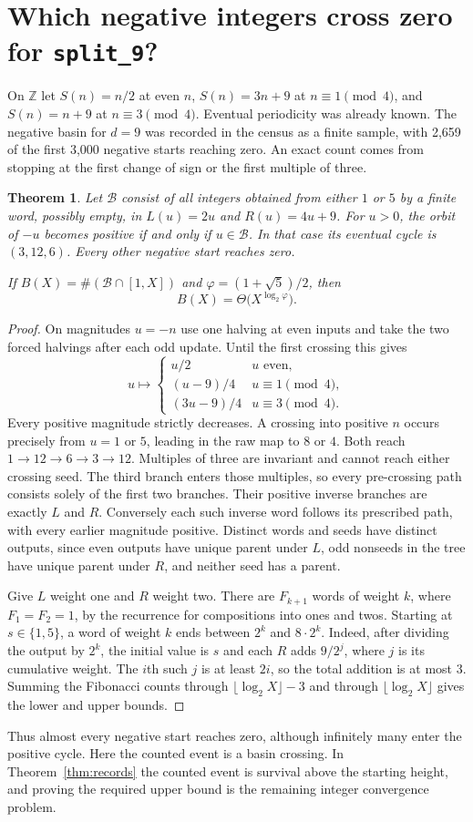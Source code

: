 \documentclass[11pt,a4paper]{article}
\newtheorem{theorem}{Theorem}
\begin{document}
\section{Which negative integers cross zero for \texttt{split\_9}?}
On $\mathbb Z$ let $S(n)=n/2$ at even $n$, $S(n)=3n+9$ at $n\equiv1\pmod4$, and $S(n)=n+9$ at $n\equiv3\pmod4$. Eventual periodicity was already known. The negative basin for $d=9$ was recorded in the census as a finite sample, with 2,659 of the first 3,000 negative starts reaching zero. An exact count comes from stopping at the first change of sign or the first multiple of three.
\begin{theorem}
Let $\mathcal B$ consist of all integers obtained from either $1$ or $5$ by a finite word, possibly empty, in $L(u)=2u$ and $R(u)=4u+9$. For $u>0$, the orbit of $-u$ becomes positive if and only if $u\in\mathcal B$. In that case its eventual cycle is $(3,12,6)$. Every other negative start reaches zero.

If $B(X)=\#(\mathcal B\cap[1,X])$ and $\varphi=(1+\sqrt5)/2$, then
\[
 B(X)=\Theta\bigl(X^{\log_2\varphi}\bigr).
\]
\end{theorem}
\begin{proof}
On magnitudes $u=-n$ use one halving at even inputs and take the two forced halvings after each odd update. Until the first crossing this gives
\[
 u\longmapsto
 \begin{cases}
 u/2&u\text{ even},\\
 (u-9)/4&u\equiv1\pmod4,\\
 (3u-9)/4&u\equiv3\pmod4 .
 \end{cases}
\]
Every positive magnitude strictly decreases. A crossing into positive $n$ occurs precisely from $u=1$ or $5$, leading in the raw map to $8$ or $4$. Both reach $1\to12\to6\to3\to12$. Multiples of three are invariant and cannot reach either crossing seed. The third branch enters those multiples, so every pre-crossing path consists solely of the first two branches. Their positive inverse branches are exactly $L$ and $R$. Conversely each such inverse word follows its prescribed path, with every earlier magnitude positive. Distinct words and seeds have distinct outputs, since even outputs have unique parent under $L$, odd nonseeds in the tree have unique parent under $R$, and neither seed has a parent.

Give $L$ weight one and $R$ weight two. There are $F_{k+1}$ words of weight $k$, where $F_1=F_2=1$, by the recurrence for compositions into ones and twos. Starting at $s\in\{1,5\}$, a word of weight $k$ ends between $2^k$ and $8\cdot2^k$. Indeed, after dividing the output by $2^k$, the initial value is $s$ and each $R$ adds $9/2^j$, where $j$ is its cumulative weight. The $i$th such $j$ is at least $2i$, so the total addition is at most $3$. Summing the Fibonacci counts through $\lfloor\log_2 X\rfloor-3$ and through $\lfloor\log_2 X\rfloor$ gives the lower and upper bounds.
\end{proof}
Thus almost every negative start reaches zero, although infinitely many enter the positive cycle. Here the counted event is a basin crossing. In Theorem~\ref{thm:records} the counted event is survival above the starting height, and proving the required upper bound is the remaining integer convergence problem.
\end{document}
